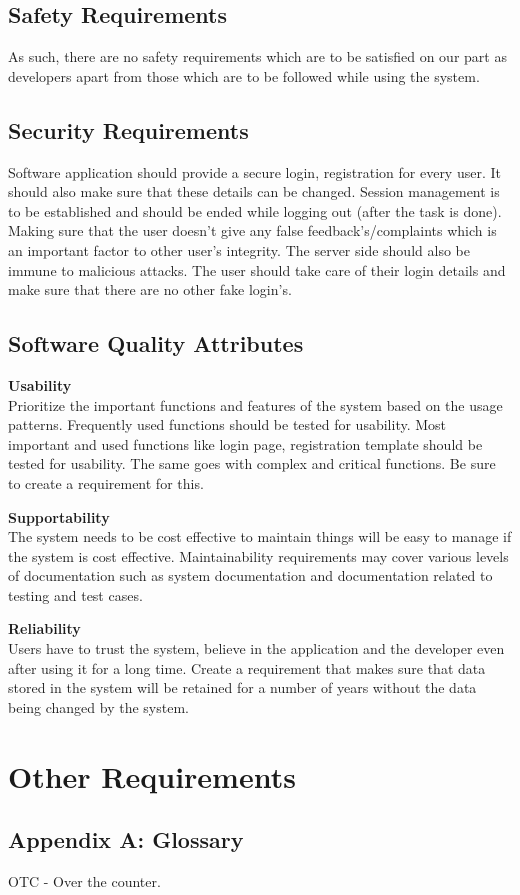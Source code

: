\documentclass{scrreprt}
\begin{document}
\section{Safety Requirements}
As such, there are no safety requirements which are to be satisfied on our part as developers apart from those which are to be followed while using the system.

\section{Security Requirements}
Software application should provide a secure login, registration for every user. It should also make sure that these details can be changed. Session management is to be established and should be ended while logging out (after the task is done). Making sure that the user doesn't give any false feedback’s/complaints which is an important factor to other user's integrity. The server side should also be immune to malicious attacks. The user should take care of their login details and make sure that there are no other fake login's. 


\section{Software Quality Attributes}

\item \textbf{Usability}\\
Prioritize the important functions and features of the system based on the usage patterns. Frequently used functions should be tested for usability. Most important and used functions like login page, registration template should be tested for usability. The same goes with complex and critical functions. Be sure to create a requirement for this.\\

\item \textbf{Supportability}\\
The system needs to be cost effective to maintain things will be easy to manage if the system is cost effective. Maintainability requirements may cover various levels of documentation such as system documentation and documentation related to testing and test cases.\\

\item \textbf{Reliability}  \\  
Users have to trust the system, believe in the application and the developer even after using it for a long time. Create a requirement that makes sure that data stored in the system will be retained for a number of years without the data being changed by the system.\\




\chapter{Other Requirements}


\section{Appendix A: Glossary}
OTC - Over the counter.
\end{document}
